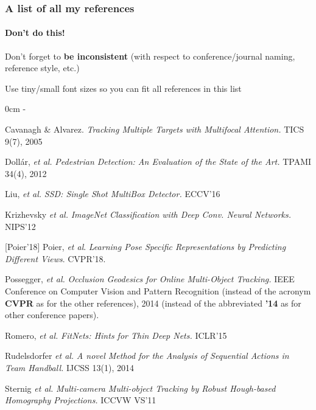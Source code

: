 \begin{frame}
  \frametitle{A list of all my references}
  \framesubtitle{\textcolor{clrsred}{\textbf{Don't do this!}}}
  \begin{lrsitemize}
    \setlength{\itemsep}{3pt}
    \item Don't forget to \textcolor{clrsred}{\textbf{be inconsistent}} (with respect to conference/journal naming, reference style, etc.)
    \item Use tiny/small font sizes so you can fit all references in this list
  \end{lrsitemize}
  \begin{lrsitemize}
    \newlength\listindent
    \setlength\listindent{12pt}
     0cm \linewidth \listindent \dimexpr\linewidth-\listindent\relax
    \scriptsize
    \setlength{\itemsep}{3pt}
    \item[] [1] Cavanagh \& Alvarez. \emph{Tracking Multiple Targets with Multifocal Attention.} TICS 9(7), 2005
    \item[] [2] Doll\'ar, \emph{et al.} \emph{Pedestrian Detection: An Evaluation of the State of the Art.} TPAMI 34(4), 2012
    \item[] [3] Liu, \emph{et al.} \emph{SSD: Single Shot MultiBox Detector.} ECCV'16
    \item[] [4] Krizhevsky \emph{et al.} \emph{ImageNet Classification with Deep Conv. Neural Networks.} NIPS'12
    \item[] \textcolor{clrsred}{[Poier'18]} Poier, \emph{et al}. \emph{Learning Pose Specific Representations by Predicting Different Views}. CVPR'18.
    \item[] [5] Possegger, \emph{et al.} \emph{Occlusion Geodesics for Online Multi-Object Tracking.} IEEE Conference on Computer Vision and Pattern Recognition (\textcolor{clrsred}{instead of the acronym \textbf{CVPR} as for the other references}), 2014 (\textcolor{clrsred}{instead of the abbreviated \textbf{'14} as for other conference papers}).
    \item[] [6] Romero, \emph{et al.} \emph{FitNets: Hints for Thin Deep Nets.} ICLR'15
    \item[] [7] Rudelsdorfer \emph{et al.} \emph{A novel Method for the Analysis of Sequential Actions in Team Handball.} IJCSS 13(1), 2014
    \item[] [8] Sternig \emph{et al.} \emph{Multi-camera Multi-object Tracking by Robust Hough-based Homography Projections.} ICCVW VS'11
  \end{lrsitemize}
\end{frame}
